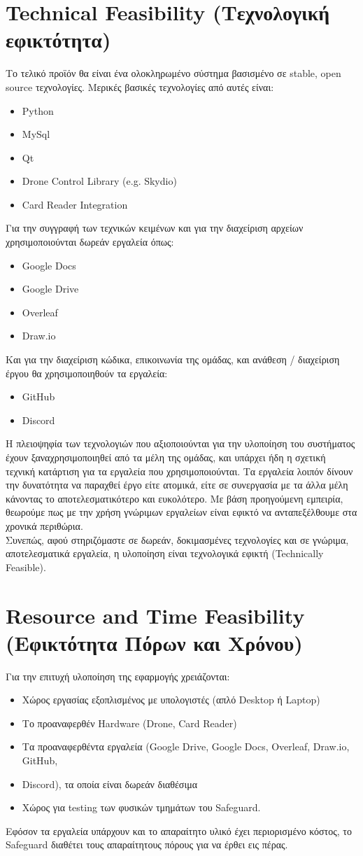 \documentclass{article}
\begin{document}
\section{Technical Feasibility (Τεχνολογική εφικτότητα)}
Το τελικό προϊόν θα είναι ένα ολοκληρωμένο σύστημα βασισμένο σε stable, open source τεχνολογίες. Μερικές βασικές τεχνολογίες από αυτές είναι:
\begin{itemize}
\item Python
\item MySql
\item Qt
\item	Drone Control Library (e.g. Skydio)
\item	Card Reader Integration
\end{itemize}
Για την συγγραφή των τεχνικών κειμένων και για την διαχείριση αρχείων χρησιμοποιούνται δωρεάν εργαλεία όπως:
\begin{itemize}
\item Google Docs
\item Google Drive
\item Overleaf
\item Draw.io
\end{itemize}
Και για την διαχείριση κώδικα, επικοινωνία της ομάδας, και ανάθεση / διαχείριση έργου θα χρησιμοποιηθούν τα εργαλεία:
\begin{itemize}
\item GitHub
\item Discord
\end{itemize}
Η πλειοψηφία των τεχνολογιών που αξιοποιούνται για την υλοποίηση του συστήματος έχουν ξαναχρησιμοποιηθεί από τα μέλη της ομάδας, και υπάρχει ήδη η σχετική τεχνική κατάρτιση για τα εργαλεία που χρησιμοποιούνται. Τα εργαλεία λοιπόν δίνουν την δυνατότητα να παραχθεί έργο είτε ατομικά, είτε σε συνεργασία με τα άλλα μέλη κάνοντας το αποτελεσματικότερο και ευκολότερο. Με βάση προηγούμενη εμπειρία, θεωρούμε πως με την χρήση γνώριμων εργαλείων είναι εφικτό να ανταπεξέλθουμε στα χρονικά περιθώρια. \\ 
Συνεπώς, αφού στηριζόμαστε σε δωρεάν, δοκιμασμένες τεχνολογίες και σε γνώριμα, αποτελεσματικά εργαλεία, η υλοποίηση είναι τεχνολογικά εφικτή (Technically Feasible).
\newpage
\section{Resource and Time Feasibility (Εφικτότητα Πόρων και Χρόνου)}
Για την επιτυχή υλοποίηση της εφαρμογής χρειάζονται:
\begin{itemize}
\item Χώρος εργασίας εξοπλισμένος με υπολογιστές (απλό Desktop ή Laptop)
\item Το προαναφερθέν Hardware (Drone, Card Reader)
\item Τα προαναφερθέντα εργαλεία (Google Drive, Google Docs, Overleaf, Draw.io, GitHub,\item Discord), τα οποία είναι δωρεάν διαθέσιμα
\item Χώρος για testing των φυσικών τμημάτων του Safeguard.
\end{itemize}
	Εφόσον τα εργαλεία υπάρχουν και το απαραίτητο υλικό έχει περιορισμένο κόστος, το Safeguard διαθέτει τους απαραίτητους πόρους για να έρθει εις πέρας.
\end{document}
